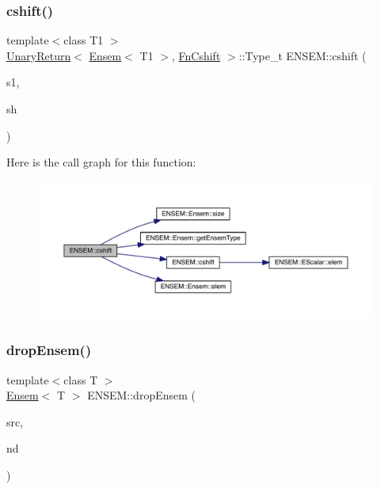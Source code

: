\subsubsection{\texorpdfstring{cshift()}{cshift()}}
{\footnotesize\ttfamily template$<$class T1 $>$ \\
\mbox{\hyperlink{structENSEM_1_1UnaryReturn}{Unary\+Return}}$<$ \mbox{\hyperlink{classENSEM_1_1Ensem}{Ensem}}$<$ T1 $>$, \mbox{\hyperlink{structENSEM_1_1FnCshift}{Fn\+Cshift}} $>$\+::Type\+\_\+t E\+N\+S\+E\+M\+::cshift (\begin{DoxyParamCaption}\item[{const \mbox{\hyperlink{classENSEM_1_1Ensem}{Ensem}}$<$ T1 $>$ \&}]{s1,  }\item[{int}]{sh }\end{DoxyParamCaption})\hspace{0.3cm}{\ttfamily [inline]}}

Here is the call graph for this function\+:\nopagebreak
\begin{figure}[H]
\begin{center}
\leavevmode
\includegraphics[width=350pt]{d1/d9e/group__eensem_gaaf138ac5ffa49ae31d5a073a994dc4c3_cgraph}
\end{center}
\end{figure}
\mbox{\label{group__eensem_gae6658352073b607eb80030d2c69e5383}} 
\subsubsection{\texorpdfstring{dropEnsem()}{dropEnsem()}}
{\footnotesize\ttfamily template$<$class T $>$ \\
\mbox{\hyperlink{classENSEM_1_1Ensem}{Ensem}}$<$ T $>$ E\+N\+S\+E\+M\+::drop\+Ensem (\begin{DoxyParamCaption}\item[{const \mbox{\hyperlink{classENSEM_1_1Ensem}{Ensem}}$<$ T $>$ \&}]{src,  }\item[{int}]{nd }\end{DoxyParamCaption})\hspace{0.3cm}{\ttfamily [inline]}}



